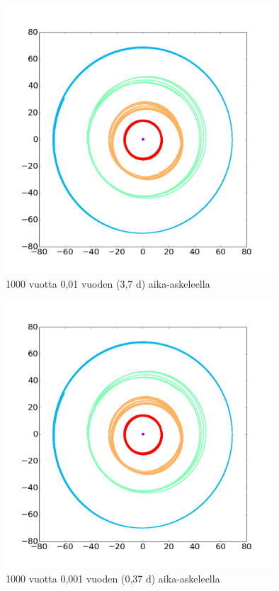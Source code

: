 \documentclass[12pt,a4paper,titlepage]{article}
\begin{document}
\begin{figure}
\centering
\includegraphics[width=10cm]{../kuvat/1000-001-mkp.png}
\caption{1000 vuotta 0,01 vuoden (3,7 d) aika-askeleella}
\label{1000-0.01}
\end{figure}

\begin{figure}
\centering
\includegraphics[width=10cm]{../kuvat/1000-001-mkp.png}
\caption{1000 vuotta 0,001 vuoden (0,37 d) aika-askeleella}
\label{1000-0.001}
\end{figure}
\end{document}
